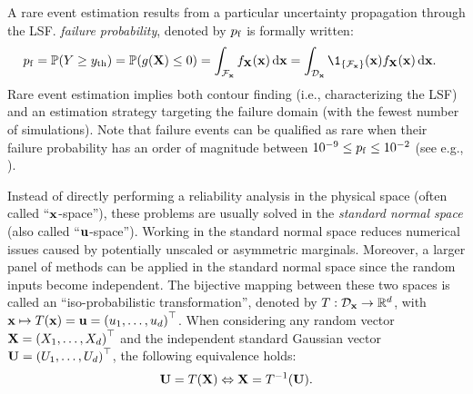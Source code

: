 A rare event estimation results from a particular uncertainty propagation through the LSF. 
\textit{failure probability}, denoted by $p_\mathrm{f}$ is formally written:%
\begin{equation}
    \begin{split}
        \pf = \P(Y \geq \yth) &= \P(g(\bX) \leq 0) = \int_{\iF_\bx} f_\bX(\bx) \, \dd\bx
        = \int_{\iD_\bx} \1_{\{\iF_\bx\}}(\bx) f_\bX(\bx) \, \dd\bx .
    \end{split}
    \label{eq:pf}
\end{equation}
Rare event estimation implies both contour finding (i.e., characterizing the LSF) and an estimation strategy targeting the failure domain (with the fewest number of simulations). 
Note that failure events can be qualified as rare when their failure probability has an order of magnitude between $10^{-9} \leq p_\mathrm{f} \leq 10^{-2}$ (see e.g., \citealp{lemaire_2009}). 

Instead of directly performing a reliability analysis in the physical space (often called ``${\bf x}$-space''), these problems are usually solved in the \emph{standard normal space} (also called ``${\bf u}$-space''). 
Working in the standard normal space reduces numerical issues caused by potentially unscaled or asymmetric marginals. 
Moreover, a larger panel of methods can be applied in the standard normal space since the random inputs become independent.   
The bijective mapping between these two spaces is called an ``iso-probabilistic transformation'', 
denoted by $T: \mathcal{D}_{{\bf x}} \rightarrow \mathbb{R}^d$, with ${\bf x} \mapsto T({\bf x}) = {\bf u} = \left(u_1, \dots, u_d\right)^\top$. 
When considering any random vector ${\bf X} = \left(X_1, \dots, X_d\right)^\top$ and the independent standard Gaussian vector ${\bf U} = \left(U_1, \dots, U_d\right)^\top$, the following equivalence holds:
\begin{equation}
    {\bf U} = T({\bf X}) \Leftrightarrow {\bf X} = T^{-1}({\bf U}).
\end{equation} 

